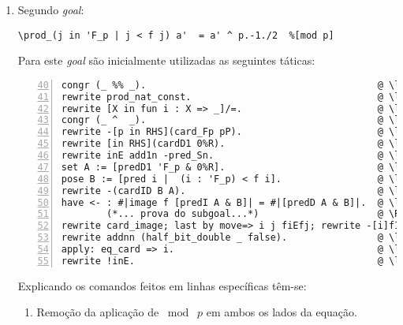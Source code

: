 \begin{enumerate}[label=\textbf{\roman*.}]
\begin{enumerate}[label=\textbf{\roman{enumi}.(\alph*)}]
\begin{enumerate}[label=\textbf{(\alph{enumii}.\arabic*)}]
                        \item Segundo \textit{goal}:
                
                                \begin{lstlisting}[language=coq,frame=single,tabsize=1]
\prod_(j in 'F_p | j < f j) a'  = a' ^ p.-1./2  %[mod p]
                                \end{lstlisting}
                        Para este \textit{goal} são inicialmente utilizadas as seguintes táticas:

                                \begin{lstlisting}[language=coq,frame=single, numbers=left,stepnumber=1,tabsize=1, escapechar=@, name=proof, firstnumber=40]
congr (_ %% _).                                         @ \label{line:40-item4b-item2} @
rewrite prod_nat_const.                                 @ \label{line:41-item4b-item2} @
rewrite [X in fun i : X => _]/=.                        @ \label{line:42-item4b-item2} @
congr (_ ^  _).                                         @ \label{line:43-item4b-item2} @
rewrite -[p in RHS](card_Fp pP).                        @ \label{line:44-item4b-item2} @
rewrite [in RHS](cardD1 0%R).                           @ \label{line:45-item4b-item2} @
rewrite inE add1n -pred_Sn.                             @ \label{line:46-item4b-item2} @
set A := [predD1 'F_p & 0%R].                           @ \label{line:47-item4b-item2} @
pose B := [pred i |  (i : 'F_p) < f i].                 @ \label{line:48-item4b-item2} @
rewrite -(cardID B A).                                  @ \label{line:49-item4b-item2} @
have <- : #|image f [predI A & B]| = #|[predD A & B]|.  @ \label{line:50-item4b-item2} \Suppressnumber @
        (*... prova do subgoal...*)                     @ \Reactivatenumber \setcounter{lstnumber}{62} @
rewrite card_image; last by move=> i j fiEfj; rewrite -[i]fI fiEfj fI. @ \label{line:63-item4b-item2} @
rewrite addnn (half_bit_double _ false).                @ \label{line:64-item4b-item2} @
apply: eq_card => i.                                    @ \label{line:65-item4b-item2} @
rewrite !inE.                                           @ \label{line:66-item4b-item2} @
                                \end{lstlisting}
                        Explicando os comandos feitos em linhas específicas têm-se:

                        \begin{enumerate}[listparindent=\parindent]

                                \item[\textbf{(\ref{line:40-item4b-item2})}] Remoção da aplicação de $\bmod \; p$ em ambos os lados da equação.


\end{enumerate}
\end{enumerate}
\end{enumerate}
\end{enumerate}
